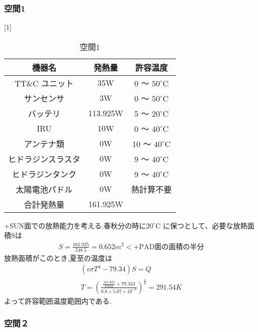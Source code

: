 \subsubsection{空間1}
\begin{table}[H]
  \begin{center}
  \caption{空間1}
  \scalebox{1}[1]{
  \begin{tabular}{|c|c|c|} \hline
    機器名 &  発熱量 & 許容温度 \\ \hline
  TT\&C ユニット
  & 35W
  & 0 〜 ${50}^\circ\mathrm{C}$\\

  サンセンサ
  & 3W
  & 0 〜 ${50}^\circ\mathrm{C}$\\

  バッテリ
  & 113.925W
  & 5 〜 ${20}^\circ\mathrm{C}$\\

  IRU
  & 10W
  & 0 〜 ${40}^\circ\mathrm{C}$\\

  アンテナ類
  & 0W
  & 10 〜 ${40}^\circ\mathrm{C}$\\

  ヒドラジンスラスタ
  & 0W
  & 9 〜 ${40}^\circ\mathrm{C}$\\

  ヒドラジンタンク
  & 0W
  & 9 〜 ${40}^\circ\mathrm{C}$\\

  太陽電池パドル
  & 0W
  &  熱計算不要\\ \hline

  合計発熱量
  & 161.925W
  & \\\hline
  \end{tabular}
  }
\end{center}
\end{table}

+SUN面での放熱能力を考える.春秋分の時に${20}^\circ\mathrm{C}$
に保つとして、必要な放熱面積Sは
\begin{eqnarray}
  S=\frac{161.925}{248.5}=0.652m^2<\text{+PAD面の面積の半分}
\end{eqnarray}
放熱面積がこのとき,夏至の温度は
\begin{eqnarray}
  (\epsilon\sigma T^4 -79.34)S=Q\\
  T =(\frac{\frac{161.925}{0.652}+79.343}
  {0.8\times5.67\times10^{-8}})^{\frac{1}{4}}=291.54K
\end{eqnarray}
よって許容範囲温度範囲内である.

\subsubsection{空間２}

